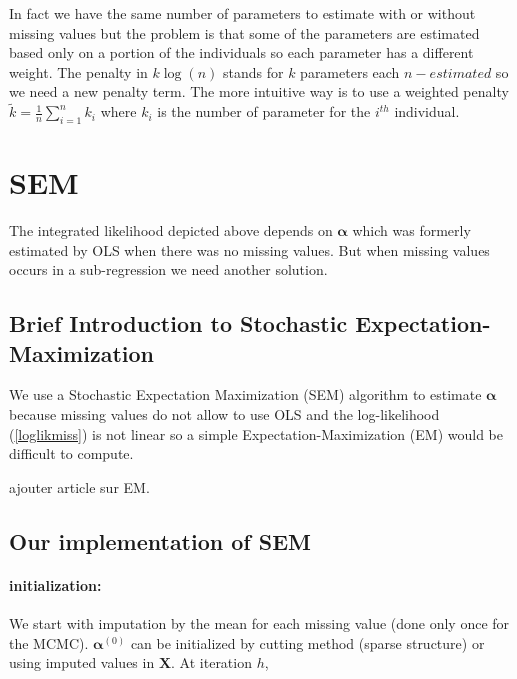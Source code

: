 \documentclass[12pt,a4paper]{report}
\begin{document}
%	
			
			In fact we have the same number of parameters to estimate with or without missing values but the problem is that some of the parameters are estimated based only on a portion of the individuals so each parameter has a different weight.
			The penalty in $k\log(n)$ stands for $k$ parameters each $n-estimated$ so we need a new penalty term. The more intuitive way is to use a weighted penalty $\tilde{k}=\frac{1}{n}\sum_{i=1}^nk_i$ where $k_i$ is the number of parameter for the $i^{th}$ individual.
	
\section{SEM}
	The integrated likelihood depicted above depends on $\boldsymbol{\alpha}$ which was formerly estimated by OLS when there was no missing values. But when missing values occurs in a sub-regression we need another solution.
	
	\subsection{Brief Introduction to Stochastic Expectation-Maximization}	
	We use a  Stochastic Expectation Maximization (SEM) algorithm \cite{celeux1986algorithme} to estimate $\boldsymbol{\alpha}$ because missing values do not allow to use OLS and  the log-likelihood (\ref{loglikmiss}) is not linear so a simple Expectation-Maximization (EM) would be difficult to compute.
	
ajouter article sur EM.	
	
	\subsection{Our implementation of SEM}
	\paragraph{initialization:} We start with imputation by the mean for each missing value (done only once for the MCMC). $\boldsymbol{\alpha}^{(0)}$ can be initialized by cutting method	(sparse structure) or using imputed values in $\boldsymbol{X}$.
	At iteration $h$,
\end{document}
